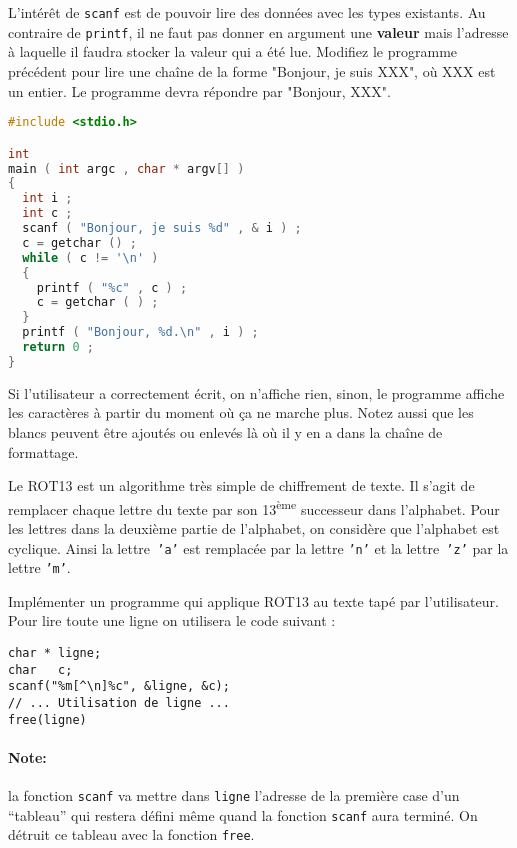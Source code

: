 \question L'intérêt de \texttt{scanf} est de pouvoir lire des données
avec les types existants. Au contraire de \texttt{printf}, il ne faut
pas donner en argument une \textbf{valeur} mais l'adresse à laquelle
il faudra stocker la valeur qui a été lue. Modifiez le programme
précédent pour lire une chaîne de la forme "Bonjour, je suis XXX", où
XXX est un entier. Le programme devra répondre par "Bonjour, XXX".

\begin{solutioncachee}
  \begin{lstlisting}[language=C]
 #include <stdio.h>

int
main ( int argc , char * argv[] )
{
  int i ;
  int c ;
  scanf ( "Bonjour, je suis %d" , & i ) ;
  c = getchar () ;
  while ( c != '\n' )
  {
    printf ( "%c" , c ) ;
    c = getchar ( ) ;
  }
  printf ( "Bonjour, %d.\n" , i ) ;
  return 0 ;
}   
  \end{lstlisting}
  Si l'utilisateur a correctement écrit, on n'affiche rien, sinon, le
  programme affiche les caractères à partir du moment où ça ne marche
  plus. Notez aussi que les blancs peuvent être ajoutés ou enlevés là
  où il y en a dans la chaîne de formattage.
\end{solutioncachee}


Le ROT13 est un algorithme très simple de chiffrement de texte.  Il
s'agit de remplacer chaque lettre du texte par son
13\textsuperscript{ème} successeur dans l'alphabet.  Pour les lettres
dans la deuxième partie de l'alphabet, on considère que l'alphabet est
cyclique.  Ainsi la lettre\texttt{ 'a'} est remplacée par la lettre
\texttt{'n'} et la lettre\texttt{ 'z'} par la lettre \texttt{'m'}.

\question Implémenter un programme qui applique ROT13 au texte tapé
par l'utilisateur. Pour lire toute une ligne on utilisera le code
suivant :
\begin{lstlisting}
char * ligne;
char   c;
scanf("%m[^\n]%c", &ligne, &c);
// ... Utilisation de ligne ...
free(ligne)
\end{lstlisting}
\paragraph{Note:} la fonction \texttt{scanf} va mettre dans
\texttt{ligne} l'adresse de la première case d'un ``tableau'' qui
restera défini même quand la fonction \texttt{scanf} aura terminé. On
détruit ce tableau avec la fonction \texttt{free}.


